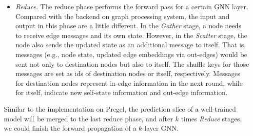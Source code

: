 \documentclass[conference]{IEEEtran}
\begin{document}
\begin{itemize}
\item \emph{Reduce.}
The reduce phase performs the forward pass for a certain GNN layer.
Compared with the backend on graph processing system, the input and output in this phase are a little different.
In the \emph{Gather} stage, a node needs to receive edge messages and its own state. However, in the \emph{Scatter} stage, the node also sends the updated state as an additional message to itself.
That is, messages (e.g., node state, updated edge embeddings via out-edges) would be sent not only to destination nodes but also to itself.
The shuffle keys for those messages are set as ids of destination nodes or itself, respectively.
Messages for destination nodes represent in-edge information in the next round, while for itself, indicate new self-state information and out-edge information.
\end{itemize}

Similar to the implementation on Pregel, the prediction slice of a well-trained model will be merged to the last reduce phase, and after $k$ times \emph{Reduce} stages, we could finish the forward propagation of a $k$-layer GNN. 
\end{document}
